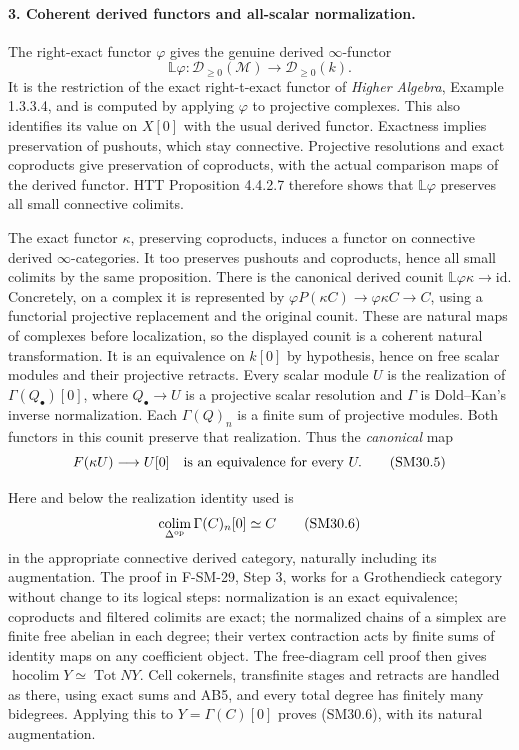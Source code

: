 \documentclass[11pt,a4paper]{article}
\theoremstyle{definition}\newtheorem{definition}[theorem]{Definition}
\theoremstyle{remark}\newtheorem{remark}[theorem]{Remark}
\begin{document}
\paragraph{3. Coherent derived functors and all-scalar normalization.}
The right-exact functor \(\varphi\) gives the genuine derived
\(\infty\)-functor
\[
 \mathbb L\varphi:\mathcal D_{\ge0}(\mathcal M)
                     \longrightarrow\mathcal D_{\ge0}(k).
\]
It is the restriction of the exact right-t-exact functor of
\emph{Higher Algebra}, Example 1.3.3.4, and is computed by
applying \(\varphi\) to projective complexes.  This also
identifies its value on \(X[0]\) with the usual derived functor.
Exactness implies preservation of pushouts, which stay connective.
Projective resolutions and exact coproducts give preservation
of coproducts, with the actual comparison maps of the derived
functor.  HTT Proposition 4.4.2.7 therefore shows that
\(\mathbb L\varphi\) preserves all small connective colimits.

The exact functor \(\kappa\), preserving coproducts, induces
a functor on connective derived \(\infty\)-categories.
It too preserves pushouts and coproducts, hence all small
colimits by the same proposition.  There is the canonical
derived counit \(\mathbb L\varphi\kappa\to\mathrm{id}\).
Concretely, on a complex it is represented by
\(\varphi P(\kappa C)\to\varphi\kappa C\to C\), using
a functorial projective replacement and the original counit.
These are natural maps of complexes before localization, so
the displayed counit is a coherent natural transformation.
It is an equivalence on \(k[0]\) by hypothesis, hence on
free scalar modules and their projective retracts.
Every scalar module \(U\) is the realization of
\(\Gamma(Q_\bullet)[0]\), where \(Q_\bullet\to U\) is a
projective scalar resolution and \(\Gamma\) is Dold--Kan's
inverse normalization.  Each \(\Gamma(Q)_n\) is a finite sum
of projective modules.  Both functors in this counit preserve
that realization.  Thus the \emph{canonical} map
\[
             F(\kappa U)\longrightarrow U[0]
 \quad\hbox{is an equivalence for every }U.                \tag{SM30.5}
\]

Here and below the realization identity used is
\[
 \operatorname*{colim}_{\Delta^{\rm op}}\Gamma(C)_n[0]
                          \simeq C                       \tag{SM30.6}
\]
in the appropriate connective derived category, naturally
including its augmentation.  The proof in F-SM-29, Step 3,
works for a Grothendieck category without change to its logical
steps: normalization is an exact equivalence; coproducts and
filtered colimits are exact; the normalized chains of a simplex
are finite free abelian in each degree; their vertex contraction
acts by finite sums of identity maps on any coefficient object.
The free-diagram cell proof then gives
\(\operatorname{hocolim}Y\simeq\operatorname{Tot}NY\).
Cell cokernels, transfinite stages and retracts are handled as
there, using exact sums and AB5, and every total degree has
finitely many bidegrees.  Applying this to \(Y=\Gamma(C)[0]\)
proves (SM30.6), with its natural augmentation.
\end{document}
